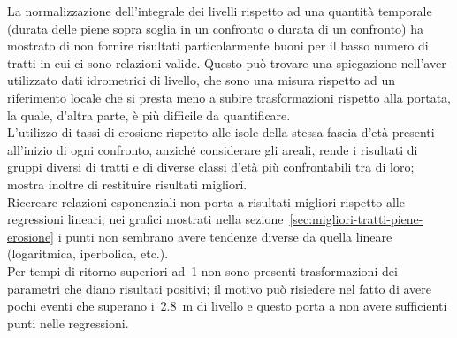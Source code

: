 La normalizzazione dell'integrale dei livelli rispetto ad una quantità temporale (durata delle piene sopra soglia in un confronto o durata di un confronto) ha mostrato di non fornire risultati particolarmente buoni per il basso numero di tratti in cui ci sono relazioni valide. Questo può trovare una spiegazione nell'aver utilizzato dati idrometrici di livello, che sono una misura rispetto ad un riferimento locale che si presta meno a subire trasformazioni rispetto alla portata, la quale, d'altra parte, è più difficile da quantificare.
\\
L'utilizzo di tassi di erosione rispetto alle isole della stessa fascia d'età presenti all'inizio di ogni confronto, anziché considerare gli areali, rende i risultati di gruppi diversi di tratti e di diverse classi d'età più confrontabili tra di loro; mostra inoltre di restituire risultati migliori.
\\
Ricercare relazioni esponenziali non porta a risultati migliori rispetto alle regressioni lineari; nei grafici mostrati nella sezione~\ref{sec:migliori-tratti-piene-erosione} i punti non sembrano avere tendenze diverse da quella lineare (logaritmica, iperbolica, etc.).
\\
Per tempi di ritorno superiori ad~\SI{1}{\anno} non sono presenti trasformazioni dei parametri che diano risultati positivi; il motivo può risiedere nel fatto di avere pochi eventi che superano i~\SI{2.8}{\m} di livello e questo porta a non avere sufficienti punti nelle regressioni.
